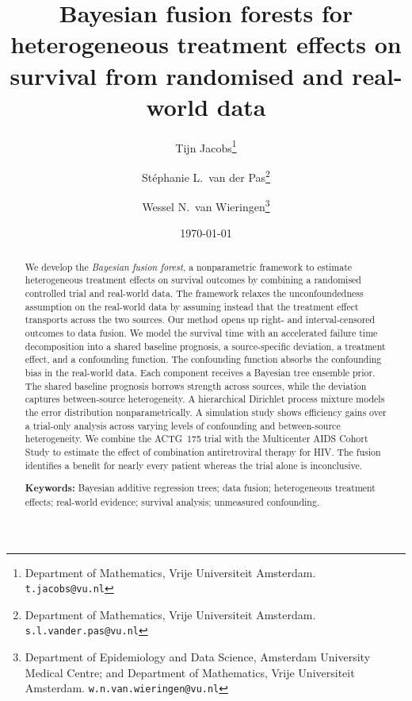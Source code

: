 \documentclass[11pt]{article}
\title{Bayesian fusion forests for heterogeneous treatment effects on survival from randomised and real-world data}
\author{
  Tijn Jacobs\thanks{Department of Mathematics, Vrije Universiteit Amsterdam. \texttt{t.jacobs@vu.nl}} \and
  St\'ephanie L.\ van der Pas\thanks{Department of Mathematics, Vrije Universiteit Amsterdam. \texttt{s.l.vander.pas@vu.nl}} \and
  Wessel N.\ van Wieringen\thanks{Department of Epidemiology and Data Science, Amsterdam University Medical Centre; and Department of Mathematics, Vrije Universiteit Amsterdam. \texttt{w.n.van.wieringen@vu.nl}}
}
\date{\today}
\theoremstyle{plain}
\theoremstyle{definition}
\theoremstyle{remark}
\newcommand{\1}{\mathds{1}}
\begin{document}
\maketitle

\begin{abstract}
We develop the \emph{Bayesian fusion forest}, a nonparametric framework to estimate heterogeneous treatment effects on survival outcomes by combining a randomised controlled trial and real-world data.
The framework relaxes the unconfoundedness assumption on the real-world data by assuming instead that the treatment effect transports across the two sources.
Our method opens up right- and interval-censored outcomes to data fusion.
We model the survival time with an accelerated failure time decomposition into a shared baseline prognosis, a source-specific deviation, a treatment effect, and a confounding function.
The confounding function absorbs the confounding bias in the real-world data.
Each component receives a Bayesian tree ensemble prior.
The shared baseline prognosis borrows strength across sources, while the deviation captures between-source heterogeneity.
A hierarchical Dirichlet process mixture models the error distribution nonparametrically.
A simulation study shows efficiency gains over a trial-only analysis across varying levels of confounding and between-source heterogeneity.
We combine the ACTG~175 trial with the Multicenter AIDS Cohort Study to estimate the effect of combination antiretroviral therapy for HIV.
The fusion identifies a benefit for nearly every patient whereas the trial alone is inconclusive.

\medskip
\noindent\textbf{Keywords:} Bayesian additive regression trees; data fusion; heterogeneous treatment effects; real-world evidence; survival analysis; unmeasured confounding.
\end{abstract}













\end{document}
